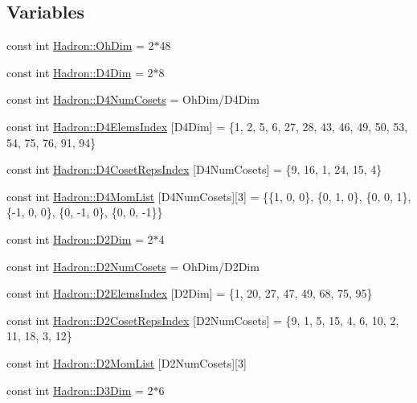 \subsection*{Variables}
\begin{DoxyCompactItemize}
\item 
const int \mbox{\hyperlink{namespaceHadron_a2bea98b7ecd13619ef78b6d204d59707}{Hadron\+::\+Oh\+Dim}} = 2$\ast$48
\item 
const int \mbox{\hyperlink{namespaceHadron_a7cc48609a6458d05394bf6349cfbf4ca}{Hadron\+::\+D4\+Dim}} = 2$\ast$8
\item 
const int \mbox{\hyperlink{namespaceHadron_a7271d98ab4cd4b0564cf4eacf6702230}{Hadron\+::\+D4\+Num\+Cosets}} = Oh\+Dim/D4\+Dim
\item 
const int \mbox{\hyperlink{namespaceHadron_afd73b89ce6fc83184a91cff050931ff4}{Hadron\+::\+D4\+Elems\+Index}} \mbox{[}D4\+Dim\mbox{]} = \{1, 2, 5, 6, 27, 28, 43, 46, 49, 50, 53, 54, 75, 76, 91, 94\}
\item 
const int \mbox{\hyperlink{namespaceHadron_a9af222d257dfd087f91192daf5876c6c}{Hadron\+::\+D4\+Coset\+Reps\+Index}} \mbox{[}D4\+Num\+Cosets\mbox{]} = \{9, 16, 1, 24, 15, 4\}
\item 
const int \mbox{\hyperlink{namespaceHadron_aa5f7990f1895fa2ed975c2a6cbfbc284}{Hadron\+::\+D4\+Mom\+List}} \mbox{[}D4\+Num\+Cosets\mbox{]}\mbox{[}3\mbox{]} = \{\{1, 0, 0\}, \{0, 1, 0\}, \{0, 0, 1\}, \{-\/1, 0, 0\}, \{0, -\/1, 0\}, \{0, 0, -\/1\}\}
\item 
const int \mbox{\hyperlink{namespaceHadron_af071977674047009b141391b4256dc12}{Hadron\+::\+D2\+Dim}} = 2$\ast$4
\item 
const int \mbox{\hyperlink{namespaceHadron_a4e182e6efe3c7594360137b45836d532}{Hadron\+::\+D2\+Num\+Cosets}} = Oh\+Dim/D2\+Dim
\item 
const int \mbox{\hyperlink{namespaceHadron_ad481c51b99eb36018e012864825a09fb}{Hadron\+::\+D2\+Elems\+Index}} \mbox{[}D2\+Dim\mbox{]} = \{1, 20, 27, 47, 49, 68, 75, 95\}
\item 
const int \mbox{\hyperlink{namespaceHadron_a3158fcd763d5c6e042be73a11c683843}{Hadron\+::\+D2\+Coset\+Reps\+Index}} \mbox{[}D2\+Num\+Cosets\mbox{]} = \{9, 1, 5, 15, 4, 6, 10, 2, 11, 18, 3, 12\}
\item 
const int \mbox{\hyperlink{namespaceHadron_abcf1382c26424df96bdeef91a583d542}{Hadron\+::\+D2\+Mom\+List}} \mbox{[}D2\+Num\+Cosets\mbox{]}\mbox{[}3\mbox{]}
\item 
const int \mbox{\hyperlink{namespaceHadron_ab94267da351bd0fdc72c0d49d22e617b}{Hadron\+::\+D3\+Dim}} = 2$\ast$6

\end{DoxyCompactItemize}
